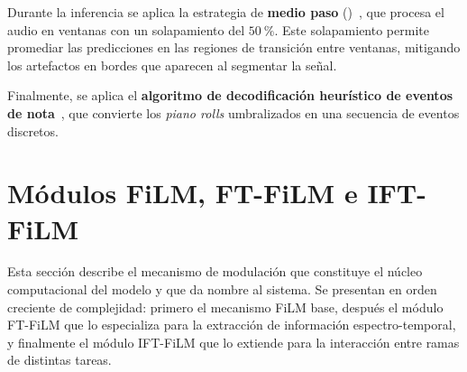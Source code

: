\documentclass[11pt,spanish,listoffigures,listoftables]{tfgetsinf}
\begin{document}
Durante la inferencia se aplica la estrategia de 
\textbf{medio paso} ()~\cite{toyama2023hftt}, que 
procesa el audio en ventanas con un solapamiento del $50~\%$. Este solapamiento 
permite promediar las predicciones en las regiones de transición entre ventanas, 
mitigando los artefactos en bordes que aparecen al segmentar la señal.

Finalmente, se aplica el \textbf{algoritmo de decodificación heurístico de 
eventos de nota}~\cite{hawthorne2018onsetsframes}, que convierte los 
\textit{piano rolls} umbralizados en una secuencia de eventos discretos.



\section{Módulos FiLM, FT-FiLM e IFT-FiLM}
\label{sec:ftfilm_iftfilm}

Esta sección describe el mecanismo de modulación que constituye el núcleo 
computacional del modelo y que da nombre al sistema. Se presentan en orden 
creciente de complejidad: primero el mecanismo FiLM base, después el módulo 
FT-FiLM que lo especializa para la extracción de información espectro-temporal, 
y finalmente el módulo IFT-FiLM que lo extiende para la interacción entre ramas 
de distintas tareas.
\end{document}
